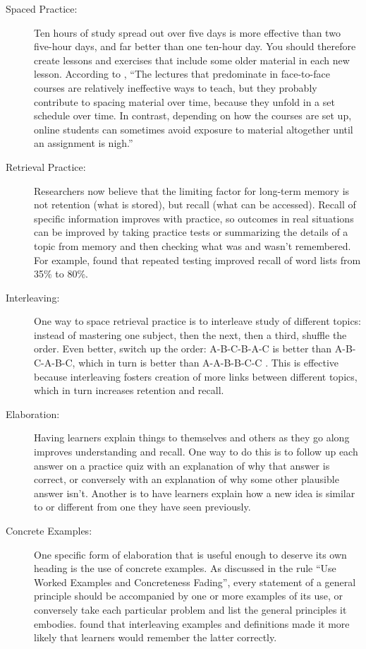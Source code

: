 \documentclass[10pt,letterpaper]{article}
\begin{document}
\begin{description}

\item[Spaced Practice:] Ten hours of study spread out over five days is more
  effective than two five-hour days, and far better than one ten-hour day. You
  should therefore create lessons and exercises that include some older material
  in each new lesson.  According to \cite{Mill2016}, ``The lectures that
  predominate in face-to-face courses are relatively ineffective ways to teach,
  but they probably contribute to spacing material over time, because they
  unfold in a set schedule over time.  In contrast, depending on how the courses
  are set up, online students can sometimes avoid exposure to material
  altogether until an assignment is nigh.''

\item[Retrieval Practice:] Researchers now believe that the limiting factor for
  long-term memory is not retention (what is stored), but recall (what can be
  accessed).  Recall of specific information improves with practice, so outcomes
  in real situations can be improved by taking practice tests or summarizing the
  details of a topic from memory and then checking what was and wasn't
  remembered. For example, \cite{Karp2008} found that repeated testing improved
  recall of word lists from 35\% to 80\%.

\item[Interleaving:] One way to space retrieval practice is to interleave study
  of different topics: instead of mastering one subject, then the next, then a
  third, shuffle the order. Even better, switch up the order: A-B-C-B-A-C is
  better than A-B-C-A-B-C, which in turn is better than A-A-B-B-C-C
  \cite{Rohr2015}. This is effective because interleaving fosters creation of
  more links between different topics, which in turn increases retention and
  recall.

\item[Elaboration:] Having learners explain things to themselves and others as
  they go along improves understanding and recall. One way to do this is to
  follow up each answer on a practice quiz with an explanation of why that
  answer is correct, or conversely with an explanation of why some other
  plausible answer isn't. Another is to have learners explain how a new idea is
  similar to or different from one they have seen previously.

\item[Concrete Examples:] One specific form of elaboration that is useful enough
  to deserve its own heading is the use of concrete examples.  As discussed in
  the rule ``Use Worked Examples and Concreteness Fading'', every statement of a
  general principle should be accompanied by one or more examples of its use, or
  conversely take each particular problem and list the general principles it
  embodies. \cite{Raws2014} found that interleaving examples and definitions
  made it more likely that learners would remember the latter correctly.


\end{description}
\end{document}
